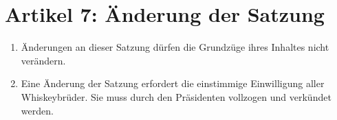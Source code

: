 \documentclass[a4paper,12pt]{article}
\begin{document}
\section*{Artikel 7: Änderung der Satzung}

\begin{enumerate}

\item Änderungen an dieser Satzung dürfen die Grundzüge ihres Inhaltes nicht verändern.

\item Eine Änderung der Satzung erfordert die einstimmige Einwilligung aller Whiskeybrüder. Sie muss
  durch den Präsidenten vollzogen und verkündet werden.

\end{enumerate}
\end{document}
